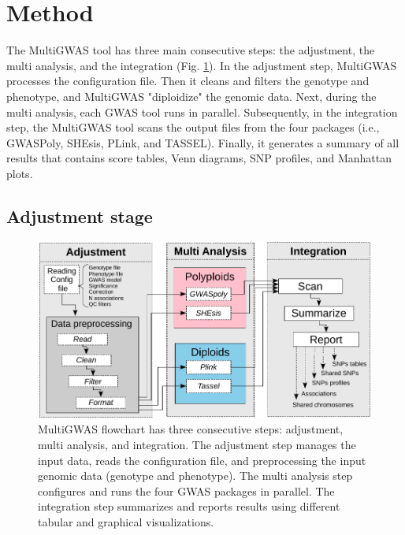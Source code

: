\documentclass{article}
\begin{document}
\section{Method}

The MultiGWAS tool has three main consecutive steps: the adjustment, the multi analysis, and the integration (Fig. \ref{fig:Pipeline}). In the adjustment step, MultiGWAS processes the configuration file. Then it cleans and filters the genotype and phenotype, and  MultiGWAS "diploidize" the genomic data. Next, during the multi analysis, each GWAS tool runs in parallel. Subsequently, in the integration step, the MultiGWAS tool scans the output files from the four packages (i.e., GWASPoly, SHEsis, PLink, and TASSEL). Finally, it generates a summary of all results that contains score tables, Venn diagrams, SNP profiles, and Manhattan plots. 



\subsection{Adjustment stage}

\begin{figure}
\includegraphics[width=12cm]{images/multiGWAS-flowchart-stages} \caption{MultiGWAS flowchart has three consecutive steps: adjustment, multi analysis, and integration. The adjustment step manages the input data, reads the configuration file, and preprocessing the input genomic data (genotype and phenotype). The multi analysis step configures and runs the four GWAS packages in parallel.  The integration step summarizes and reports results using different tabular and graphical visualizations.\label{fig:Pipeline}}
\end{figure}
\end{document}
